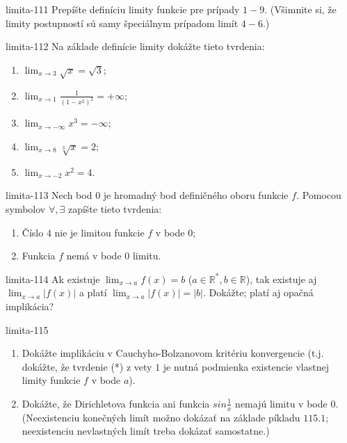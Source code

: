 \begin{defproblem}{limita-111}
Prepíšte definíciu limity funkcie pre prípady $1-9$. (Všimnite si, že limity postupností sú samy špeciálnym prípadom limít $4-6$.)
\end{defproblem}

\begin{defproblem}{limita-112}
Na základe definície limity dokážte tieto tvrdenia:
\begin{enumerate}
\item $\lim_{x \rightarrow 3} \sqrt{x}=\sqrt{3}$;
\item $\lim_{x \rightarrow 1} \frac{1}{(1-x^2)^2}=+\infty$;
\item $\lim_{x \rightarrow -\infty}x^3=-\infty$;
\item $\lim_{x \rightarrow 8} \sqrt[3]{x}=2$;
\item $\lim_{x \rightarrow -2} x^2=4$.
\end{enumerate}
\end{defproblem}

\begin{defproblem}{limita-113}
Nech bod $0$ je hromadný bod definičného oboru funkcie $f$. Pomocou symbolov $\forall, \exists$ zapíšte tieto tvrdenia:
\begin{enumerate}
\item Číslo $4$ nie je limitou funkcie $f$ v bode $0$;
\item Funkcia $f$ nemá v bode $0$ limitu.
\end{enumerate}
\end{defproblem}

\begin{defproblem}{limita-114}
Ak existuje $\lim_{x \rightarrow a} f(x)=b$ ($a \in \mathbb{R^*},b \in \mathbb{R}$), tak existuje aj $\lim_{x \rightarrow a} |f(x)|$ a platí $\lim_{x \rightarrow a} |f(x)|=|b|$. Dokážte; platí aj opačná implikácia?
\end{defproblem}

\begin{defproblem}{limita-115}
\begin{enumerate}
\item Dokážte implikáciu v Cauchyho-Bolzanovom kritériu konvergencie (t.j. dokážte, že tvrdenie (*) z vety $1$ je nutná podmienka existencie vlastnej limity funkcie $f$ v bode $a$).
\item Dokážte, že Dirichletova funkcia ani funkcia $sin \frac{1}{x}$ nemajú limitu v bode $0$. (Neexistenciu konečných limít možno dokázať na základe píkladu $115.1$; neexistenciu nevlastných limít treba dokázať samostatne.)
\end{enumerate}
\end{defproblem}

